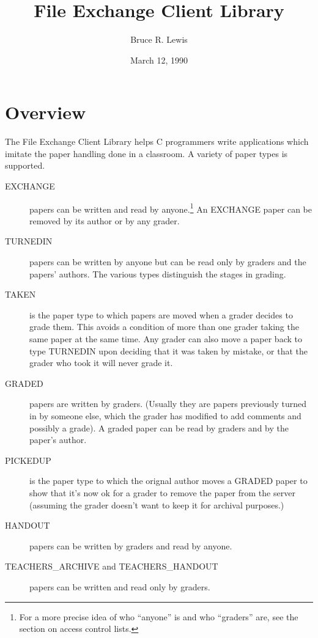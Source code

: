 
\title{File Exchange Client Library}
\author{Bruce R. Lewis}
\date{March 12, 1990}

\addtolength{\oddsidemargin}{-.5in}
\addtolength{\evensidemargin}{-.5in}
\addtolength{\textwidth}{1in}


\maketitle
\tableofcontents
\newpage

\section{Overview}

The File Exchange Client Library helps C programmers write
applications which imitate the paper handling done in a classroom.  A
variety of paper types is supported.

\begin{description}

\item [EXCHANGE] papers can be written and read by
anyone.\footnote{For a more precise idea of who ``anyone'' is and who
``graders'' are, see the section on access control lists.}  An EXCHANGE
paper can be removed by its author or by any grader.

\item [TURNEDIN] papers can be written
by anyone but can be read only by graders and the papers' authors.  The
various types distinguish the stages in grading.

\item [TAKEN] is the paper type to which papers are moved when a grader
decides to grade them.  This avoids a condition of more than one grader
taking the same paper at the same time.  Any grader can also move a
paper back to type TURNEDIN upon deciding that it was taken by mistake,
or that the grader who took it will never grade it.

\item [GRADED] papers are written by graders.  (Usually they are papers
previously turned in by someone else, which the grader has modified to
add comments and possibly a grade).  A graded paper can be read by
graders and by the paper's author.

\item [PICKEDUP] is the paper type to which the orignal author moves a
GRADED paper to show that it's now ok for a grader to remove the paper
from the server (assuming the grader doesn't want to keep it for
archival purposes.)

\item [HANDOUT] papers can be written by graders and read by anyone.

\item [TEACHERS\_ARCHIVE and TEACHERS\_HANDOUT] papers can be written
and read only by graders.

\end{description}

